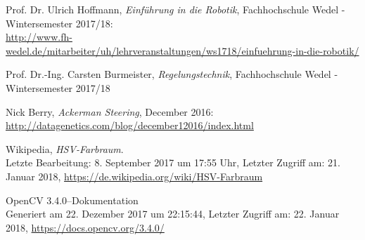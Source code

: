 \documentclass[a4paper,12pt]{report}
\begin{document}
\begin{thebibliography}{9}

	Prof. Dr. Ulrich Hoffmann,
	\textit{Einführung in die Robotik},
	Fachhochschule Wedel - Wintersemester 2017/18:\\
	\url{http://www.fh-wedel.de/mitarbeiter/uh/lehrveranstaltungen/ws1718/einfuehrung-in-die-robotik/}

	Prof. Dr.-Ing. Carsten Burmeister,
	\textit{Regelungstechnik},
	Fachhochschule Wedel - Wintersemester 2017/18

	Nick Berry,
	\textit{Ackerman Steering},
	December 2016:\\
	\url{http://datagenetics.com/blog/december12016/index.html}

	Wikipedia,
	\textit{HSV-Farbraum}.\\
	Letzte Bearbeitung: 8. September 2017 um 17:55 Uhr,
	Letzter Zugriff am: 21. Januar 2018,
	\url{https://de.wikipedia.org/wiki/HSV-Farbraum}
	
	OpenCV 3.4.0--Dokumentation\\
	Generiert am 22. Dezember 2017 um 22:15:44,
	Letzter Zugriff am: 22. Januar 2018,
	\url{https://docs.opencv.org/3.4.0/}

\end{thebibliography}
\end{document}

